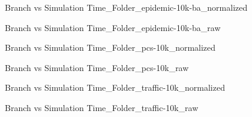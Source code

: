\vspace{1cm}
\begin{figure}[H]
\centering

\caption{Branch vs Simulation Time\_Folder\_epidemic-10k-ba\_normalized}
\end{figure}
\vspace{1cm}
\newpage
\begin{figure}[H]
\centering

\caption{Branch vs Simulation Time\_Folder\_epidemic-10k-ba\_raw}
\end{figure}
\vspace{1cm}
\begin{figure}[H]
\centering

\caption{Branch vs Simulation Time\_Folder\_pcs-10k\_normalized}
\end{figure}
\vspace{1cm}
\newpage
\begin{figure}[H]
\centering

\caption{Branch vs Simulation Time\_Folder\_pcs-10k\_raw}
\end{figure}
\vspace{1cm}
\begin{figure}[H]
\centering

\caption{Branch vs Simulation Time\_Folder\_traffic-10k\_normalized}
\end{figure}
\vspace{1cm}
\newpage
\begin{figure}[H]
\centering

\caption{Branch vs Simulation Time\_Folder\_traffic-10k\_raw}
\end{figure}
\vspace{1cm}
\newpage


